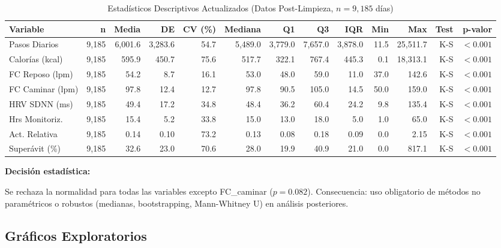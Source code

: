 \documentclass[12pt,letterpaper,twoside]{report}
\begin{document}
\begin{landscape}
\begin{table}[htbp]
\centering
\caption{Estadísticos Descriptivos Actualizados (Datos Post-Limpieza, $n=9,185$ días)}
\label{tab:descriptive_daily}
\footnotesize
\begin{tabular}{lrrrrrrrrrrrr}
\toprule
\textbf{Variable} & \textbf{n} & \textbf{Media} & \textbf{DE} & \textbf{CV (\%)} & \textbf{Mediana} & \textbf{Q1} & \textbf{Q3} & \textbf{IQR} & \textbf{Min} & \textbf{Max} & \textbf{Test} & \textbf{p-valor} \\
\midrule
Pasos Diarios & 9,185 & 6,001.6 & 3,283.6 & 54.7 & 5,489.0 & 3,779.0 & 7,657.0 & 3,878.0 & 11.5 & 25,511.7 & K-S & $<0.001$ \\
Calorías (kcal) & 9,185 & 595.9 & 450.7 & 75.6 & 517.7 & 322.1 & 767.4 & 445.3 & 0.1 & 18,313.1 & K-S & $<0.001$ \\
FC Reposo (lpm) & 9,185 & 54.2 & 8.7 & 16.1 & 53.0 & 48.0 & 59.0 & 11.0 & 37.0 & 142.6 & K-S & $<0.001$ \\
FC Caminar (lpm) & 9,185 & 97.8 & 12.4 & 12.7 & 97.8 & 90.5 & 105.0 & 14.5 & 50.0 & 159.0 & K-S & $<0.001$ \\
HRV SDNN (ms) & 9,185 & 49.4 & 17.2 & 34.8 & 48.4 & 36.2 & 60.4 & 24.2 & 9.8 & 135.4 & K-S & $<0.001$ \\
Hrs Monitoriz. & 9,185 & 15.4 & 5.2 & 33.8 & 15.0 & 13.0 & 18.0 & 5.0 & 1.0 & 65.0 & K-S & $<0.001$ \\
Act. Relativa & 9,185 & 0.14 & 0.10 & 73.2 & 0.13 & 0.08 & 0.18 & 0.09 & 0.0 & 2.15 & K-S & $<0.001$ \\
Superávit (\%) & 9,185 & 32.6 & 23.0 & 70.6 & 28.0 & 19.9 & 40.9 & 21.0 & 0.0 & 817.1 & K-S & $<0.001$ \\
\bottomrule
\end{tabular}
\end{table}
\end{landscape}

\begin{decisionbox}
\textbf{Decisión estadística:}

Se rechaza la normalidad para todas las variables excepto FC\_caminar ($p=0.082$). Consecuencia: uso obligatorio de métodos no paramétricos o robustos (medianas, bootstrapping, Mann-Whitney U) en análisis posteriores.
\end{decisionbox}

\subsection{Gráficos Exploratorios}
\end{document}
